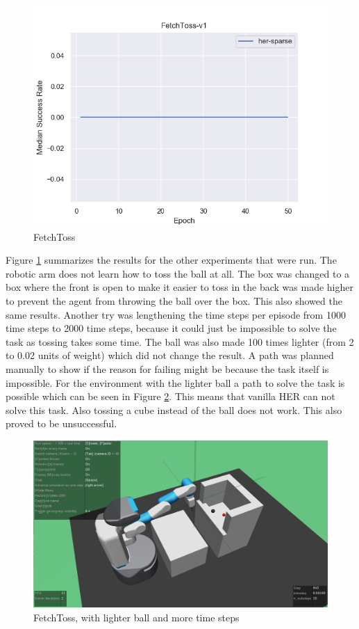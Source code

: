 \begin{figure} [!ht]
	
	\centering
	\includegraphics[width=1\textwidth]{figures/fig_FetchToss-v1.png}
	\caption{FetchToss}
	\label{toss2}
\end{figure}

Figure \ref{toss2} summarizes the results for the other experiments that were run. The robotic arm does not learn how to toss the ball at all. The box was changed to a box where the front is open to make it easier to toss in the back was made higher to prevent the agent from throwing the ball over the box. This also showed the same results. Another try was lengthening the time steps per episode from 1000 time steps to 2000 time steps, because it could just be impossible to solve the task as tossing takes some time. The ball was also made 100 times lighter (from 2 to 0.02 units of weight) which did not change the result. A path was planned manually to show if the reason for failing might be because the task itself is impossible. For the environment with the lighter ball a path to solve the task is possible which can be seen in Figure \ref{toss3}. This means that vanilla HER can not solve this task. Also tossing a cube instead of the ball does not work. This also proved to be unsuccessful. 

\begin{figure} [!h]
	
	\centering
	\includegraphics[width=1\textwidth]{figures/FetchToss-v0.png}
	\caption{FetchToss, with lighter ball and more time steps}
	\label{toss3}
\end{figure}

